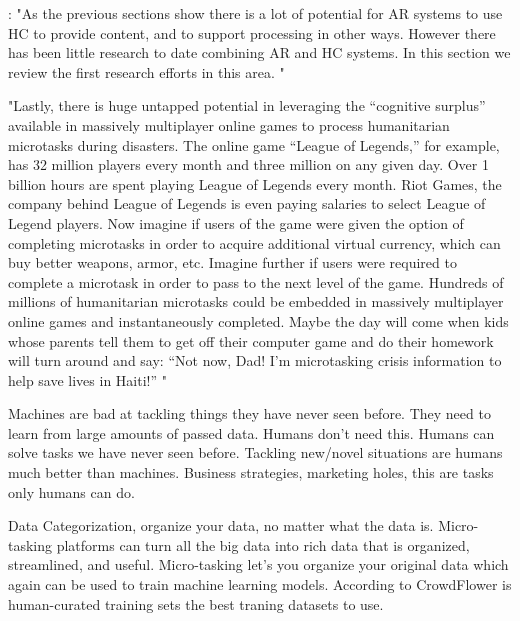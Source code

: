 \citep{Meier2013}:  "As the previous sections show there is a lot of potential for AR systems to use HC to provide content, and to support processing in other ways. However there has been
little research to date combining AR and HC systems. In this section we review the first research efforts in this area. " 

\citep{Meier2013} "Lastly, there is huge untapped potential in leveraging the “cognitive surplus” available in massively multiplayer online games to process humanitarian microtasks during disasters. The online game “League of Legends,” for example, has 32 million players every month and three million on any given day. Over 1 billion hours are spent playing League of Legends every month. Riot Games, the company behind League of Legends is even paying salaries to select League of Legend players. Now imagine if users of the game were given the option of completing microtasks in order to acquire additional virtual currency, which can buy better weapons, armor, etc. Imagine further if users were required to complete a microtask in order to pass to the next level of the game. Hundreds of millions of humanitarian microtasks could be embedded in massively multiplayer online games and instantaneously completed. Maybe the day will come when kids whose parents tell them to get off their computer game and do their homework will turn around and say: “Not now, Dad! I’m microtasking crisis information to help save lives in Haiti!” "

Machines are bad at tackling things they have never seen before. They need to learn from large amounts of passed data. Humans don't need this. Humans can solve tasks we have never seen before. Tackling new/novel situations are humans much better than machines. Business strategies, marketing holes, this are tasks only humans can do.   %

Data Categorization, organize your data, no matter what the data is. Micro-tasking platforms can turn all the big data into rich data that is organized, streamlined, and useful. Micro-tasking let's you organize your original data which again can be used to train machine learning models. According to CrowdFlower is human-curated training sets the best traning datasets to use. %